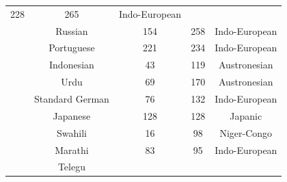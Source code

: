 \begin{center}
{\begin{tabular}{|c|c|c|c|c|}
228 &
	

265 &
	

Indo-European \\

	\thetablecount\stepcounter{tablecount} &
Russian &
	

154 &
	

258 &
	

Indo-European \\

	\thetablecount\stepcounter{tablecount} &
Portuguese &
	

221 &
	

234 &
	

Indo-European \\
	\thetablecount\stepcounter{tablecount} &

Indonesian &
	

43 &
	

119 &
	

Austronesian \\

	\thetablecount\stepcounter{tablecount} &
Urdu &
	

69 &
	

170 &
	

Austronesian \\
	\thetablecount\stepcounter{tablecount} &

Standard German &
	

76 &
	

132 &
	

Indo-European \\
	\thetablecount\stepcounter{tablecount} &

Japanese &
	

128 &
	

128 &
	

Japanic \\

	\thetablecount\stepcounter{tablecount} &
Swahili &
	

16 &
	

98 &
	

Niger-Congo \\
	\thetablecount\stepcounter{tablecount} &

Marathi &
	

83 &
	

95 &
	

Indo-European \\

	\thetablecount\stepcounter{tablecount} &
Telegu &
	


\end{tabular}}
\end{center}
